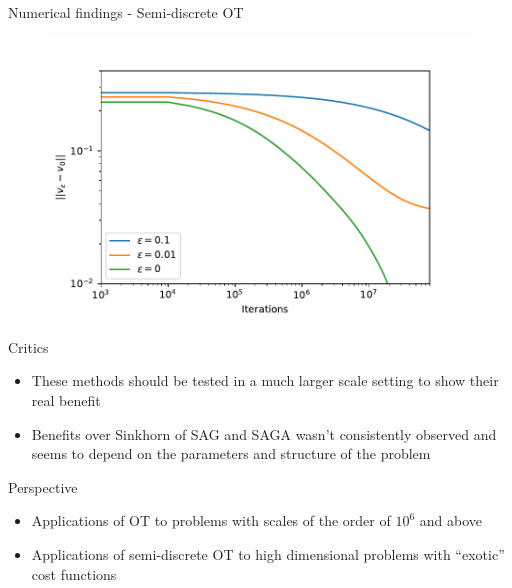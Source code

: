 \documentclass{beamer}
\begin{document}
\begin{frame}{Numerical findings - Semi-discrete OT}
\begin{minipage}{.49\linewidth}
\begin{figure}
        \end{figure}
        \begin{figure}
            \includegraphics[width=.9\linewidth]{figures/semi_discrete_eps2.pdf}
        \end{figure}
    \end{minipage}
\end{frame}

\begin{frame}{Critics}
    \begin{itemize}
        \item These methods should be tested in a much larger scale setting to show their real benefit
        \item Benefits over Sinkhorn of SAG and SAGA wasn't consistently observed and seems to depend on the parameters and structure of the problem
    \end{itemize}
\end{frame}

\begin{frame}{Perspective}
    \begin{itemize}
        \item Applications of OT to problems with scales of the order of $10^6$ and above
        \item Applications of semi-discrete OT to high dimensional problems with ``exotic'' cost functions
    \end{itemize}
\end{frame}
\end{document}
